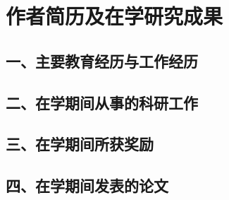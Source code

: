 \chapter*{作者简历及在学研究成果}
\section*{一、主要教育经历与工作经历}\vspace*{2cm}
\section*{二、在学期间从事的科研工作}\vspace*{2cm}
\section*{三、在学期间所获奖励}\vspace*{2cm}
\section*{四、在学期间发表的论文}\vspace*{2cm}
